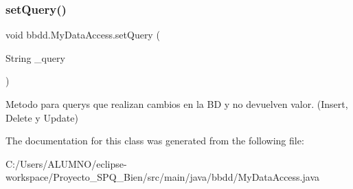 \subsubsection{\texorpdfstring{set\+Query()}{setQuery()}}
{\footnotesize\ttfamily void bbdd.\+My\+Data\+Access.\+set\+Query (\begin{DoxyParamCaption}\item[{String}]{\+\_\+query }\end{DoxyParamCaption})}

Metodo para querys que realizan cambios en la BD y no devuelven valor. (Insert, Delete y Update) 

The documentation for this class was generated from the following file\+:\begin{DoxyCompactItemize}
\item 
C\+:/\+Users/\+A\+L\+U\+M\+N\+O/eclipse-\/workspace/\+Proyecto\+\_\+\+S\+P\+Q\+\_\+Bien/src/main/java/bbdd/My\+Data\+Access.\+java\end{DoxyCompactItemize}
